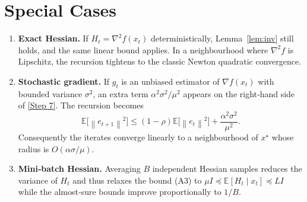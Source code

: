 \documentclass{article}
\newcommand{\E}{\mathbb{E}}
\newcommand{\norm}[1]{\left\lVert #1\right\rVert}
\begin{document}
\section*{Special Cases}
\begin{enumerate}[label=\alph*)]
\item \textbf{Exact Hessian.} If $H_t=\nabla^{2}f(x_t)$ deterministically,
    Lemma~\ref{lem:inv} still holds, and the same linear bound applies.
    In a neighbourhood where $\nabla^{2}f$ is Lipschitz, the recursion
    tightens to the classic Newton quadratic convergence.
\item \textbf{Stochastic gradient.} If $g_t$ is an unbiased estimator of
    $\nabla f(x_t)$ with bounded variance $\sigma^{2}$,
    an extra term $\alpha^{2}\sigma^{2}/\mu^{2}$ appears on the right‑hand side of
    \eqref{Step 7}.  The recursion becomes
    \[
       \E\!\bigl[\norm{e_{t+1}}^{2}\bigr]
       \le (1-\rho)\E\!\bigl[\norm{e_t}^{2}\bigr]
          +\frac{\alpha^{2}\sigma^{2}}{\mu^{2}}.
    \]
    Consequently the iterates converge linearly to a neighbourhood of $x^{\star}$
    whose radius is $O(\alpha\sigma/\mu)$.
\item \textbf{Mini‑batch Hessian.} Averaging $B$ independent Hessian samples
    reduces the variance of $H_t$ and thus relaxes the bound (A3) to
    $\mu I\preceq \E[H_t\mid x_t]\preceq L I$ while the almost‑sure bounds improve
    proportionally to $1/B$.
\end{enumerate}
\end{document}
